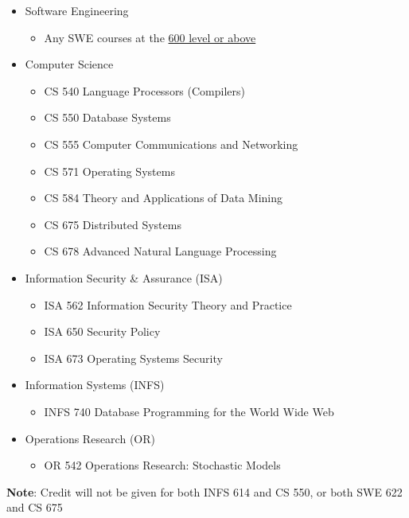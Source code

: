 \documentclass[oneside,11pt]{memoir}
\begin{document}
\begin{itemize} 
\item Software Engineering
\begin{itemize}
    \item Any SWE courses at the \href{https://catalog.gmu.edu/courses/swe/}{600 level or above}
\end{itemize}
\item Computer Science

\begin{itemize}
    \item CS 540 Language Processors (Compilers)
    \item CS 550 Database Systems
    \item CS 555 Computer Communications and Networking
    \item CS 571 Operating Systems
    \item CS 584 Theory and Applications of Data Mining
    \item CS 675 Distributed Systems
    \item CS 678 Advanced Natural Language Processing
\end{itemize}

\item Information Security \& Assurance (ISA)

\begin{itemize}
    \item ISA 562 Information Security Theory and Practice
    \item ISA 650 Security Policy
    \item ISA 673 Operating Systems Security
\end{itemize}

\item Information Systems (INFS)
\begin{itemize}
    \item INFS 740 Database Programming for the World Wide Web
\end{itemize}

\item Operations Research (OR)
\begin{itemize}
    \item OR 542 Operations Research: Stochastic Models
\end{itemize}

\end{itemize}

\textbf{Note}: Credit will not be given for both INFS 614 and CS 550, or both SWE 622 and CS 675
\end{document}
